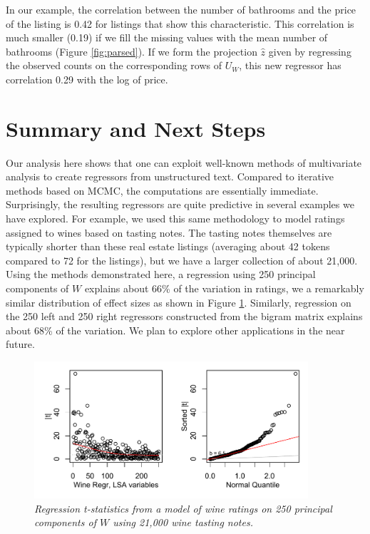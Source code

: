\documentclass[12pt]{article}
\begin{document}
 
 In our example, the correlation between the number of bathrooms and the price of the listing is 0.42 for listings that show this characteristic.  This correlation is much smaller (0.19) if we fill the missing values with the mean number of bathrooms (Figure  \ref{fig:parsed}).  If we form the projection $\hat{z}$ given by regressing the observed counts on the corresponding rows of $U_W$, this new regressor has correlation 0.29 with the log of price.



\section{Summary and Next Steps}
\label{sec:disc}
  
 Our analysis here shows that one can exploit well-known methods of multivariate analysis to create regressors from unstructured text.  Compared to iterative methods based on MCMC, the computations are essentially immediate.  Surprisingly, the resulting regressors are quite predictive in several examples we have explored.  For example, we used this same methodology to model ratings assigned to wines based on tasting notes.  The tasting notes themselves are typically shorter than these real estate listings (averaging about 42 tokens compared to 72 for the listings), but we have a larger collection of about 21,000.  Using the methods demonstrated here, a regression using 250 principal components of $W$ explains about 66\% of the variation in ratings, we a remarkably similar distribution of effect sizes as shown in Figure \ref{fig:wine}.  Similarly, regression on the 250 left and 250 right regressors constructed from the bigram matrix explains about 68\% of the variation.  We plan to explore other applications in the near future.
 
 
 \begin{figure}
 \caption{ \label{fig:wine} \sl Regression t-statistics from a model of wine ratings on 250 principal components of $W$ using 21,000 wine tasting notes.}
 
 \centerline{
   \includegraphics[width=4in]{figures/wine.pdf}
   }
  \end{figure} 
  
\end{document}
